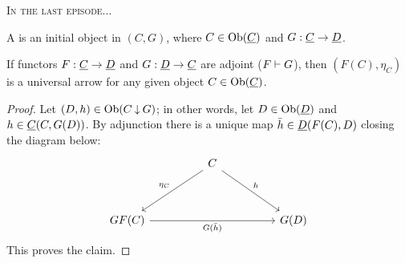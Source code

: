 
\textsc{In the last episode...}

\begin{definition*}
	A  is an initial object in \( (C \comma G) \), where \( C \in \operatorname{Ob}(\underline{C}) \) and \( G: \underline{C} \to \underline{D} \).
\end{definition*}

\begin{lemma*}
	If functors \( F: \underline{C} \to \underline{D} \) and \( G: \underline{D} \to \underline{C} \) are adjoint (\( F \mathrel{\vdash} G \)), then \( (F(C), \eta_C) \) is a universal arrow for any given object \( C \in \operatorname{Ob}(\underline{C}) \).
\end{lemma*}
\begin{proof}
	Let \( (D, h) \in \operatorname{Ob}(C \mathbin{\downarrow} G) \); in other words, let \( D \in \operatorname{Ob}(\underline{D}) \) and \( h \in \underline{C}(C, G(D)) \). By adjunction there is a unique map \( \bar{h} \in \underline{D}(F(C), D) \) closing the diagram below:
	\[
		\begin{tikzcd}
			&& C \\
			\\
			{GF(C)} &&&& {G(D)}
			\arrow["{\eta_C}"', from=1-3, to=3-1]
			\arrow["h", from=1-3, to=3-5]
			\arrow["{G(\bar{h})}"', from=3-1, to=3-5]
		\end{tikzcd}
	\]
	This proves the claim.
\end{proof}

